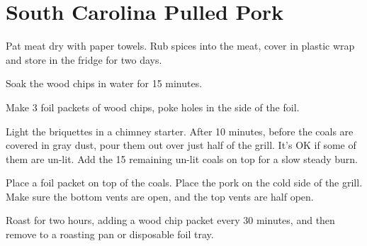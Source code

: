 \section{South Carolina Pulled Pork}
\begin{recipe}



Pat meat dry with paper towels. Rub spices into the meat, cover in plastic wrap and store in the fridge for two days.


Soak the wood chips in water for 15 minutes.

Make 3 foil packets of wood chips, poke holes in the side of the foil.


Light the briquettes in a chimney starter. After 10 minutes, before the coals are covered in gray dust, pour them out over just half of the grill.
It's OK if some of them are un-lit. Add the 15 remaining un-lit coals on top for a slow steady burn.

Place a foil packet on top of the coals. Place the pork on the cold side of the grill.
Make sure the bottom vents are open, and the top vents are half open.

Roast for two hours, adding a wood chip packet every 30 minutes, and then remove to a roasting pan or disposable foil tray.



\end{recipe}
